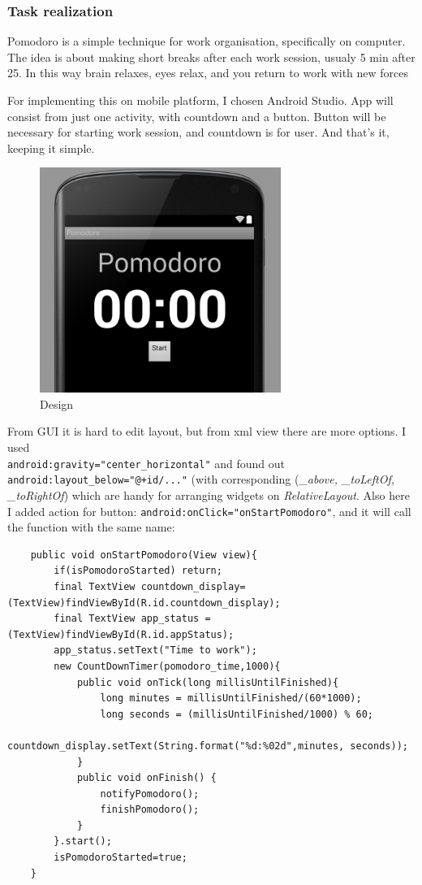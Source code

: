 \subsubsection{Task realization}
Pomodoro is a simple technique for work organisation, specifically on computer. The 
idea is about making short breaks after each work session, usualy 5 min after 25.
In this way brain relaxes, eyes relax, and you return to work with new forces

For implementing this on mobile platform, I chosen Android Studio. App will consist 
from just one activity, with countdown and a button. Button will be necessary for
starting work session, and countdown is for user. And that's it, keeping it simple.
\begin{figure}[H]
    \centering
    \includegraphics[width=0.7\textwidth]{screen1.png}
    \caption{Design}
    \label{fig:design}
\end{figure}

From GUI it is hard to edit layout, but from xml view there are more options. I used\\%
\texttt{android:gravity="center\_horizontal"} and found out 
\texttt{android:layout\_below="@+id/..."} (with corresponding (\emph{\_above, \_toLeftOf, \_toRightOf})
which are handy for arranging widgets on \emph{RelativeLayout}. Also here I added action
for button: \texttt{android:onClick="onStartPomodoro"}, and it will call the function with the same name:

\begin{verbatim}
    public void onStartPomodoro(View view){
        if(isPomodoroStarted) return; 
        final TextView countdown_display= (TextView)findViewById(R.id.countdown_display);
        final TextView app_status = (TextView)findViewById(R.id.appStatus);
        app_status.setText("Time to work");
        new CountDownTimer(pomodoro_time,1000){
            public void onTick(long millisUntilFinished){
                long minutes = millisUntilFinished/(60*1000);
                long seconds = (millisUntilFinished/1000) % 60;
                countdown_display.setText(String.format("%d:%02d",minutes, seconds));
            }
            public void onFinish() {
                notifyPomodoro();
                finishPomodoro();
            }
        }.start();
        isPomodoroStarted=true;
    }


\end{verbatim}

